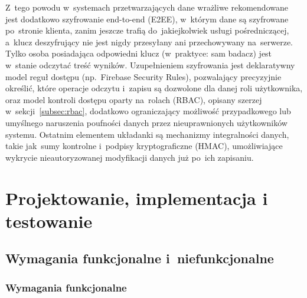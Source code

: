 \documentclass[12pt, a4paper, oneside]{report}
\begin{document}
Z~tego powodu w~systemach przetwarzających dane wrażliwe rekomendowane
jest dodatkowo szyfrowanie end-to-end (E2EE), w~którym dane są
szyfrowane po~stronie klienta, zanim jeszcze trafią do~jakiejkolwiek
usługi pośredniczącej, a~klucz deszyfrujący nie jest nigdy przesyłany
ani przechowywany na~serwerze. Tylko osoba posiadająca odpowiedni
klucz (w~praktyce: sam badacz) jest w~stanie odczytać treść wyników.
Uzupełnieniem szyfrowania jest deklaratywny model reguł dostępu
(np.~Firebase Security Rules), pozwalający precyzyjnie określić, które
operacje odczytu i~zapisu są dozwolone dla danej roli użytkownika,
oraz model kontroli dostępu oparty na~rolach (RBAC), opisany szerzej
w~sekcji~\ref{subsec:rbac}, dodatkowo ograniczający możliwość
przypadkowego lub umyślnego naruszenia poufności danych przez
nieuprawnionych użytkowników systemu. Ostatnim elementem układanki są
mechanizmy integralności danych, takie jak~sumy kontrolne i~podpisy
kryptograficzne (HMAC), umożliwiające wykrycie nieautoryzowanej
modyfikacji danych już po~ich zapisaniu.


\chapter{Projektowanie, implementacja i testowanie}
\label{chap:impl}


\section{Wymagania funkcjonalne i~niefunkcjonalne}
\label{sec:wymagania}

\subsection{Wymagania funkcjonalne}
\label{subsec:wym-funk}
\end{document}
